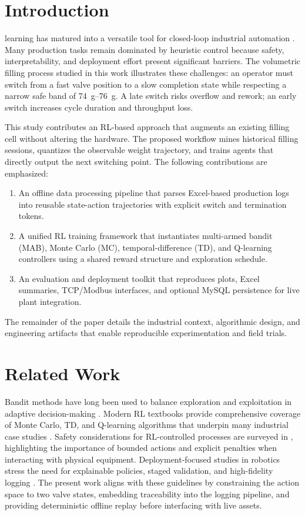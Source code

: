 \documentclass[journal]{IEEEtranTIE}
\begin{document}
\section{Introduction}
 learning has matured into a versatile tool for closed-loop industrial automation \cite{Sutton2018}. Many production tasks remain dominated by heuristic control because safety, interpretability, and deployment effort present significant barriers. The volumetric filling process studied in this work illustrates these challenges: an operator must switch from a fast valve position to a slow completion state while respecting a narrow safe band of \SIrange{74}{76}{g}. A late switch risks overflow and rework; an early switch increases cycle duration and throughput loss.

This study contributes an RL-based approach that augments an existing filling cell without altering the hardware. The proposed workflow mines historical filling sessions, quantizes the observable weight trajectory, and trains agents that directly output the next switching point. The following contributions are emphasized:
\begin{enumerate}[1)]
  \item An offline data processing pipeline that parses Excel-based production logs into reusable state-action trajectories with explicit switch and termination tokens.
  \item A unified RL training framework that instantiates multi-armed bandit (MAB), Monte Carlo (MC), temporal-difference (TD), and Q-learning controllers using a shared reward structure and exploration schedule.
  \item An evaluation and deployment toolkit that reproduces plots, Excel summaries, TCP/Modbus interfaces, and optional MySQL persistence for live plant integration.
\end{enumerate}
The remainder of the paper details the industrial context, algorithmic design, and engineering artifacts that enable reproducible experimentation and field trials.

\section{Related Work}
Bandit methods have long been used to balance exploration and exploitation in adaptive decision-making \cite{Lai1985}. Modern RL textbooks provide comprehensive coverage of Monte Carlo, TD, and Q-learning algorithms that underpin many industrial case studies \cite{Sutton2018}. Safety considerations for RL-controlled processes are surveyed in \cite{Garcia2015}, highlighting the importance of bounded actions and explicit penalties when interacting with physical equipment. Deployment-focused studies in robotics stress the need for explainable policies, staged validation, and high-fidelity logging \cite{Kober2013}. The present work aligns with these guidelines by constraining the action space to two valve states, embedding traceability into the logging pipeline, and providing deterministic offline replay before interfacing with live assets.
\end{document}
